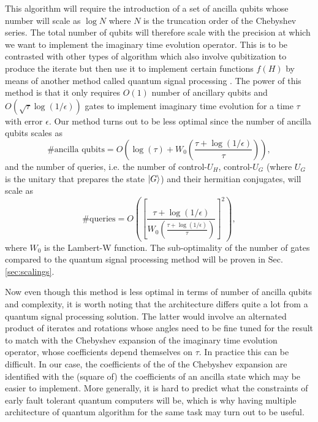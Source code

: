 \documentclass[a4paper,11pt]{article}
\begin{document}
This algorithm will require the introduction of a set of ancilla qubits whose number will scale as $\log N$ where $N$ is the truncation order of the Chebyshev series. The total number of qubits will therefore scale with the precision at which we want to implement the imaginary time evolution operator. This is to be contrasted with other types of algorithm which also involve qubitization to produce the iterate but then use it to implement certain functions $f(H)$ by means of another method called quantum signal processing \cite{PhysRevLett.118.010501, Gily_n_2019, Low2019hamiltonian}. The power of this method is that it only requires $O(1)$ number of ancillary qubits and $O\left(\sqrt{\tau}\log(1/\epsilon)\right)$ gates to implement imaginary time evolution for a time $\tau$ with error $\epsilon$. Our method turns out to be less optimal since the number of ancilla qubits scales as 
\begin{equation}
    \text{\# ancilla qubits} = O\left( \log(\tau) +  W_0\left(\frac{\tau+\log(1/\epsilon)}{\tau}\right)\right),
\label{intro1}
\end{equation}
and the number of queries, i.e. the number of control-$U_H$, control-$U_G$ (where $U_G$ is the unitary that prepares the state $\ket{G}$) and their hermitian conjugates, will scale as 
\begin{equation}
    \text{\# queries} = O\left(\left[\frac{\tau+\log(1/\epsilon)}{W_0\left(\frac{\tau+\log(1/\epsilon)}{\tau}\right)}\right]^2\right),
\label{intro2}
\end{equation}
where $W_0$ is the Lambert-W function. The sub-optimality of the number of gates compared to the quantum signal processing method will be proven in Sec. \ref{sec:scalings}.

Now even though this method is less optimal in terms of number of ancilla qubits and complexity, it is worth noting that the architecture differs quite a lot from a quantum signal processing solution. The latter would involve an alternated product of iterates and rotations whose angles need to be fine tuned for the result to match with the Chebyshev expansion of the imaginary time evolution operator, whose coefficients depend themselves on $\tau$. In practice this can be difficult. In our case, the coefficients of the of the Chebyshev expansion are identified with the (square of) the coefficients of an ancilla state which may be easier to implement. More generally, it is hard to predict what the constraints of early fault tolerant quantum computers will be, which is why having multiple architecture of quantum algorithm for the same task may turn out to be useful.
\end{document}
